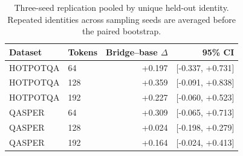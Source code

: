 \begin{table}[t]\centering\small
\begin{tabular}{llrr}\toprule
Dataset & Tokens & Bridge--base $\Delta$ & 95\% CI \\
\midrule
HOTPOTQA & 64 & +0.197 & [-0.337, +0.731] \\
HOTPOTQA & 128 & +0.359 & [-0.091, +0.838] \\
HOTPOTQA & 192 & +0.227 & [-0.060, +0.523] \\
QASPER & 64 & +0.309 & [-0.065, +0.713] \\
QASPER & 128 & +0.024 & [-0.198, +0.279] \\
QASPER & 192 & +0.164 & [-0.024, +0.413] \\
\bottomrule\end{tabular}
\caption{Three-seed replication pooled by unique held-out identity. Repeated identities across sampling seeds are averaged before the paired bootstrap.}
\label{tab:paper1-replication}
\end{table}
